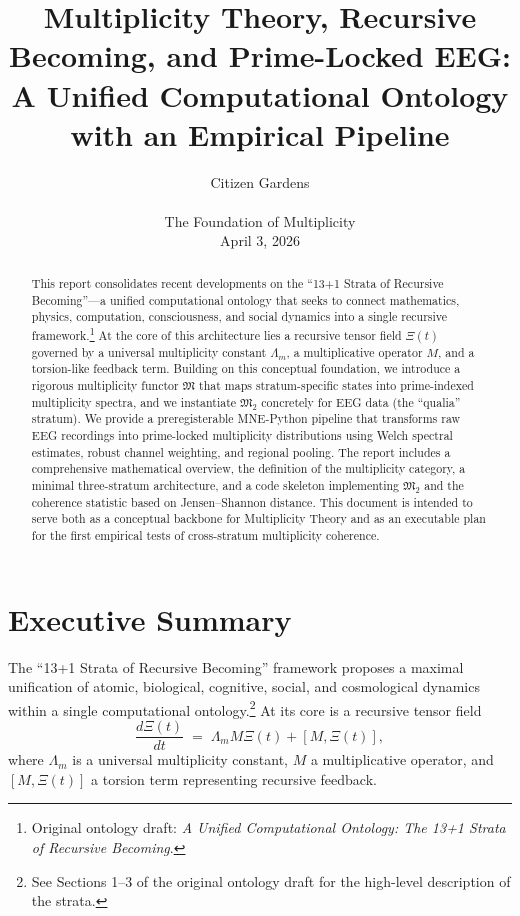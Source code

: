 \documentclass[11pt]{article}
\title{Multiplicity Theory, Recursive Becoming, and Prime-Locked EEG:\\
A Unified Computational Ontology with an Empirical Pipeline}
\author{Citizen Gardens \\ \\ The Foundation of Multiplicity \\
\vspace{0.3em}
\small April 3, 2026}
\date{}
\begin{document}
\maketitle

\begin{abstract}
This report consolidates recent developments on the ``13+1 Strata of Recursive Becoming''---a unified computational ontology that seeks to connect mathematics, physics, computation, consciousness, and social dynamics into a single recursive framework.\footnote{Original ontology draft: \emph{A Unified Computational Ontology: The 13+1 Strata of Recursive Becoming}.} At the core of this architecture lies a recursive tensor field \(\Xi(t)\) governed by a universal multiplicity constant \(\Lambda_m\), a multiplicative operator \(M\), and a torsion-like feedback term. Building on this conceptual foundation, we introduce a rigorous multiplicity functor \(\mathfrak{M}\) that maps stratum-specific states into prime-indexed multiplicity spectra, and we instantiate \(\mathfrak{M}_2\) concretely for EEG data (the ``qualia'' stratum). We provide a preregisterable MNE-Python pipeline that transforms raw EEG recordings into prime-locked multiplicity distributions using Welch spectral estimates, robust channel weighting, and regional pooling. The report includes a comprehensive mathematical overview, the definition of the multiplicity category, a minimal three-stratum architecture, and a code skeleton implementing \(\mathfrak{M}_2\) and the coherence statistic based on Jensen--Shannon distance. This document is intended to serve both as a conceptual backbone for Multiplicity Theory and as an executable plan for the first empirical tests of cross-stratum multiplicity coherence.
\end{abstract}
\newpage
\tableofcontents
\newpage
\section{Executive Summary}

The ``13+1 Strata of Recursive Becoming'' framework proposes a maximal unification of atomic, biological, cognitive, social, and cosmological dynamics within a single computational ontology.\footnote{See Sections 1--3 of the original ontology draft for the high-level description of the strata.} At its core is a recursive tensor field
\begin{equation}
  \frac{d\Xi(t)}{dt} \;=\; \Lambda_m M \Xi(t) + [M,\Xi(t)],
  \label{eq:recursive-tensor-dynamics}
\end{equation}
where \(\Lambda_m\) is a universal multiplicity constant, \(M\) a multiplicative operator, and \([M,\Xi(t)]\) a torsion term representing recursive feedback.
\end{document}
